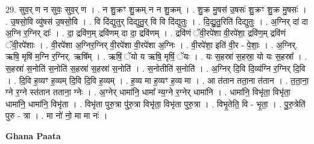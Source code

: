 \documentclass[17pt]{extarticle}
\begin{document}
29. सुव॒र् ण न सुवः॒ सुव॒र् ण । . न शु॒क्रꣳ शु॒क्रम् न न शु॒क्रम् । . शु॒क्र मु॒षस॑ उ॒षसः॑ शु॒क्रꣳ शु॒क्र मु॒षसः॑ । . उ॒षसो॒वि व्यु॑षस॑ उ॒षसो॒वि । . वि दि॑द्युतुर् दिद्युतु॒र् वि वि दि॑द्युतुः । . दि॒द्यु॒तु॒रिति॑ दिद्युतुः । . अ॒ग्निर् दा॑ दा अ॒ग्नि र॒ग्निर् दाः᳚ । . दा॒ द्रवि॑ण॒म् द्रवि॑णम् दा दा॒ द्रवि॑णम् । . द्रवि॑णं ॅवी॒रपे॑शा वी॒रपे॑शा॒ द्रवि॑ण॒म् द्रवि॑णं ॅवी॒रपे॑शाः । . वी॒रपे॑शा अ॒ग्निर॒ग्निर् वी॒रपे॑शा वी॒रपे॑शा अ॒ग्निः । . वी॒रपे॑शा॒ इति॑ वी॒र - पे॒शाः॒ । . अ॒ग्निर्. ऋषि॒ मृषि॑ म॒ग्नि र॒ग्निर्. ऋषि᳚म् । . ऋषिं॒ ॅयो य ऋषि॒ मृषिं॒ ॅयः । . यः स॒हस्रा॑ स॒हस्रा॒ यो यः स॒हस्रा᳚ । . स॒हस्रा॑ स॒नोति॑ स॒नोति॑ स॒हस्रा॑ स॒हस्रा॑ स॒नोति॑ । . स॒नोतीति॑ स॒नोति॑ । . अ॒ग्निर् दि॒वि दि॒व्य॑ग्नि र॒ग्निर् दि॒वि । . दि॒वि ह॒व्यꣳ ह॒व्यम् दि॒वि दि॒वि ह॒व्यम् । . ह॒व्य मा ह॒व्यꣳ ह॒व्य मा । . आ त॑तान तता॒ना त॑तान । . त॒ता॒ना॒ ग्ने र॒ग्ने स्त॑तान तताना॒ ग्नेः । . अ॒ग्नेर् धामा॑नि॒ धामा᳚ न्य॒ग्ने र॒ग्नेर् धामा॑नि । . धामा॑नि॒ विभृ॑ता॒ विभृ॑ता॒ धामा॑नि॒ धामा॑नि॒ विभृ॑ता । . विभृ॑ता पुरु॒त्रा पु॑रु॒त्रा विभृ॑ता॒ विभृ॑ता पुरु॒त्रा । . विभृ॒तेति॒ वि - भृ॒ता॒ । . पु॒रु॒त्रेति॑ पुरु - त्रा । . मा नो॑ नो॒ मा मा नः॑ । \newline

\textbf{Ghana Paata } \newline
\end{document}
